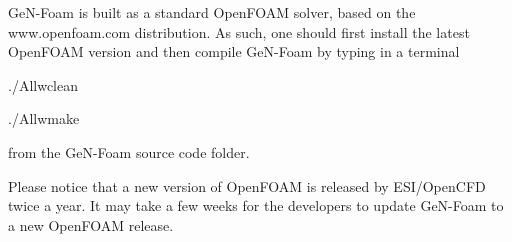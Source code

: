 Ge\+N-\/\+Foam is built as a standard Open\+F\+O\+AM solver, based on the www.\+openfoam.\+com distribution. As such, one should first install the latest Open\+F\+O\+AM version and then compile Ge\+N-\/\+Foam by typing in a terminal

{\ttfamily ./\+Allwclean}

{\ttfamily ./\+Allwmake}

from the Ge\+N-\/\+Foam source code folder.

Please notice that a new version of Open\+F\+O\+AM is released by E\+S\+I/\+Open\+C\+FD twice a year. It may take a few weeks for the developers to update Ge\+N-\/\+Foam to a new Open\+F\+O\+AM release. 